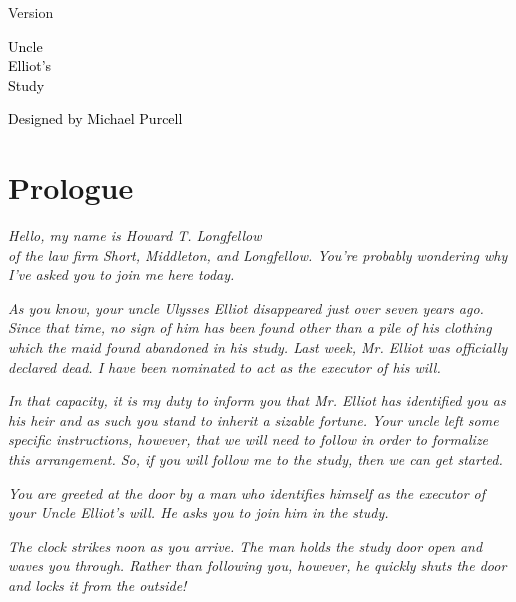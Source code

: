 \documentclass[a6paper, parskip=half, DIV=14, 12pt]{scrartcl}
\begin{document}
{%
\thispagestyle{empty}
		\enlargethispage{3.5\baselineskip} %

\setmainfont[Scale=1.0]{Caslon Antique}
\begin{center}
\makeatletter
{\footnotesize Version \@version}
\makeatother
\end{center}

\vfill

\begin{center}
{
\setmainfont[Scale=2]{Special Elite}
\Huge
\textcolor{black}{Uncle\\[0.75ex]Elliot's\\[0.75ex]Study}
}
\end{center}


\vfill{}

\begin{center}
{
\setmainfont{Bilbo Swash Caps}
\Huge
\textcolor{black}{Designed by Michael Purcell}
}
\end{center}
}


\newpage

\section*{Prologue}

\textit{Hello, my name is Howard T. Longfellow\\of the law firm Short, Middleton, and Longfellow. You're probably wondering why I've asked you to join me here today.}

\textit{As you know, your uncle Ulysses Elliot disappeared just over seven years ago. Since that time, no sign of him has been found other than a pile of his clothing which the maid found abandoned in his study. Last week, Mr. Elliot was officially declared dead. I have been nominated to act as the executor of his will.}

\textit{In that capacity, it is my duty to inform you that Mr. Elliot has identified you as his heir and as such you stand to inherit a sizable fortune. Your uncle left some specific instructions, however, that we will need to follow in order to formalize this arrangement. So, if you will follow me to the study, then we can get started.}

\newpage
\textit{You are greeted at the door by a man who identifies himself as the executor of your Uncle Elliot's will. He asks you to join him in the study.}

\textit{The clock strikes noon as you arrive. The man holds the study door open and waves you through. Rather than following you, however, he quickly shuts the door and locks it from the outside!}
\end{document}
